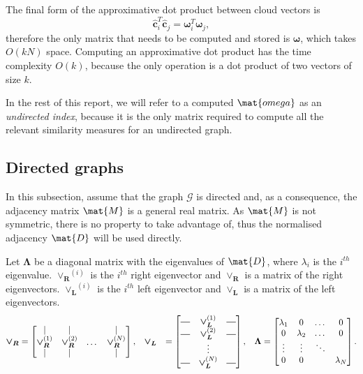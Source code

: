 \documentclass[12pt]{report}
\newcommand*{\horz}{\rule[.5ex]{2.5ex}{0.5pt}}
\begin{document}
The final form of the approximative dot product between cloud vectors is
\begin{equation}
  \bm{\hat{c}}_i^T \bm{\hat{c}}_j = \bm{\omega}_i^T \bm{\omega}_j,
\end{equation}
therefore the only matrix that needs to be computed and stored is $\bm{\omega}$,
which takes $O(kN)$ space. Computing an approximative dot product has the time
complexity $O(k)$, because the only operation is a dot product of two vectors of
size $k$.

In the rest of this report, we will refer to a computed $\mat{omega}$ as an
\emph{undirected index}, because it is the only matrix required to compute all
the relevant similarity measures for an undirected graph.



%
%

\subsection{Directed graphs}

In this subsection, assume that the graph $\mathcal{G}$ is directed and, as a
consequence, the adjacency matrix $\mat{M}$ is a general real matrix. As
$\mat{M}$ is not symmetric, there is no property to take advantage of, thus
the normalised adjacency $\mat{D}$ will be used directly.

Let $\bm{\Lambda}$ be a diagonal matrix with the eigenvalues of $\mat{D}$, where
$\lambda_i$ is the $i^{th}$ eigenvalue. $\bm{\vee_R}^{(i)}$ is the $i^{th}$
right eigenvector and $\bm{\vee_R}$ is a matrix of the right
eigenvectors. $\bm{\vee_L}^{(i)}$ is the $i^{th}$ left eigenvector and
$\bm{\vee_L}$ is a matrix of the left eigenvectors.
\begin{align}
  \bm{\vee_R} &= \begin{bmatrix}
    \vert           & \vert           &       & \vert \\
    \bm{\vee_R}^{(1)} & \bm{\vee_R}^{(2)} & \dots & \bm{\vee_R}^{(N)} \\
    \vert           & \vert           &       & \vert \end{bmatrix}, &&
  \bm{\vee_L} &= \begin{bmatrix}
      \horz   & \bm{\vee_L}^{(1)} & \horz \\
      \horz   & \bm{\vee_L}^{(2)} & \horz \\
              & \vdots            &       \\
      \horz   & \bm{\vee_L}^{(N)} & \horz \end{bmatrix}, &&
  \bm{\Lambda} = \begin{bmatrix}
    \lambda_1 & 0 		      & \dots  & 0 \\
    0 	 	    & \lambda_2   & \dots  & 0 \\
    \vdots 	  & \vdots	    & \ddots &   \\
    0	        & 0           &        & \lambda_N
  \end{bmatrix}.
\end{align}
\end{document}
